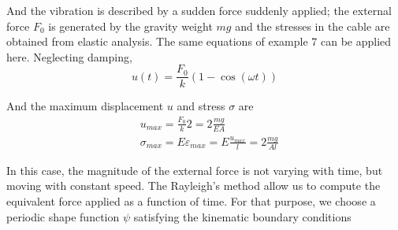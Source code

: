 \documentclass{problems}
\begin{document}
And the vibration is described by a sudden force suddenly applied; the external force $F_0$ is generated by the gravity weight $mg$ and the stresses in the cable are obtained from elastic analysis. The same equations of example 7 can be applied here. Neglecting damping,
$$
u(t) = \frac{F_0}{k}(1 -\cos(\omega t))
$$

And the maximum displacement $u$ and stress $\sigma$ are
\begin{align*}
&u_{max} = \frac{F_0}{k}2 = 2\frac{mg}{EA} \\
&\sigma_{max} = E\varepsilon_{max} = E\frac{u_{max}}{l} = 2\frac{mg}{Al}
\end{align*}



In this case, the magnitude of the external force is not varying with time, but moving with constant speed. The Rayleigh's method allow us to compute the equivalent force applied as a function of time. For that purpose, we choose a periodic shape function $\psi$ satisfying the kinematic boundary conditions
\end{document}
